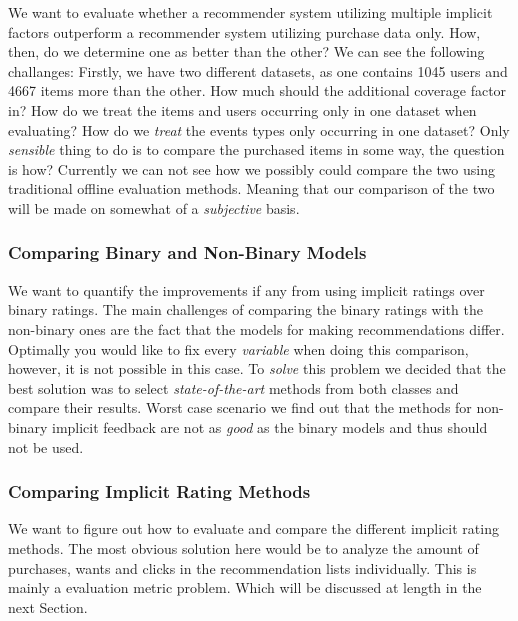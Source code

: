 
We want to evaluate whether a recommender system utilizing multiple implicit factors outperform
a recommender system utilizing purchase data only.
How, then, do we determine one as better than the other? We can see the following challanges:
Firstly, we have two different datasets, as one contains 1045 users and 4667 items more than the
other. How much should the additional coverage factor in? How do we treat the items and users
occurring only in one dataset when evaluating? How do we \emph{treat} the events types only
occurring in one dataset? Only \emph{sensible} thing to do is to compare the purchased items
in some way, the question is how? Currently we can not see how we possibly could compare the
two using traditional offline evaluation methods. Meaning that our comparison of the two will
be made on somewhat of a \emph{subjective} basis.

\subsubsection{Comparing Binary and Non-Binary Models}

We want to quantify the improvements if any from using implicit ratings over binary ratings.
The main challenges of comparing the binary ratings with the non-binary ones are the fact
that the models for making recommendations differ. Optimally you would like to fix every
\emph{variable} when doing this comparison, however, it is not possible in this case.
To \emph{solve} this problem we decided that the best solution was to select \emph{state-of-the-art}
methods from both classes and compare their results. Worst case scenario we find out that the
methods for non-binary implicit feedback are not as \emph{good} as the binary models and thus
should not be used.

\subsubsection{Comparing Implicit Rating Methods}

We want to figure out how to evaluate and compare the different implicit rating
methods.  The most obvious solution here would be to analyze the amount of
purchases, wants and clicks in the recommendation lists individually. This is
mainly a evaluation metric problem. Which will be discussed at length in the
next Section.

